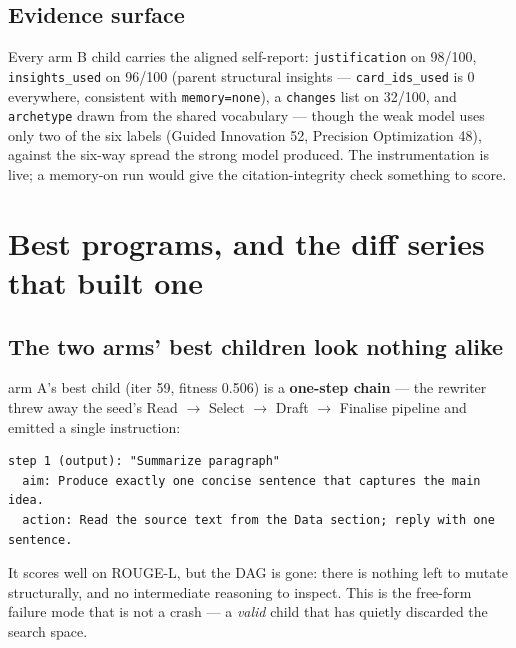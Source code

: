 \documentclass[11pt]{article}
\newcommand{\armA}{\textcolor{bad}{arm A}}
\newcommand{\armB}{\textcolor{accent}{arm B}}
\begin{document}
\subsection{Evidence surface}
Every \armB{} child carries the aligned self-report: \texttt{justification} on 98/100,
\texttt{insights\_used} on 96/100 (parent structural insights --- \texttt{card\_ids\_used} is
0 everywhere, consistent with \texttt{memory=none}), a \texttt{changes} list on 32/100, and
\texttt{archetype} drawn from the shared vocabulary --- though the weak model uses only two of
the six labels (Guided Innovation 52, Precision Optimization 48), against the six-way spread
the strong model produced. The instrumentation is live; a memory-on run would give the
citation-integrity check something to score.

\section{Best programs, and the diff series that built one}
\label{sec:series}
\subsection{The two arms' best children look nothing alike}
\armA's best child (iter 59, fitness 0.506) is a \textbf{one-step chain} --- the rewriter
threw away the seed's Read $\to$ Select $\to$ Draft $\to$ Finalise pipeline and emitted a
single instruction:
\begin{lstlisting}
step 1 (output): "Summarize paragraph"
  aim: Produce exactly one concise sentence that captures the main idea.
  action: Read the source text from the Data section; reply with one sentence.
\end{lstlisting}
It scores well on ROUGE-L, but the DAG is gone: there is nothing left to mutate structurally,
and no intermediate reasoning to inspect. This is the free-form failure mode that is not a
crash --- a \emph{valid} child that has quietly discarded the search space.
\end{document}
